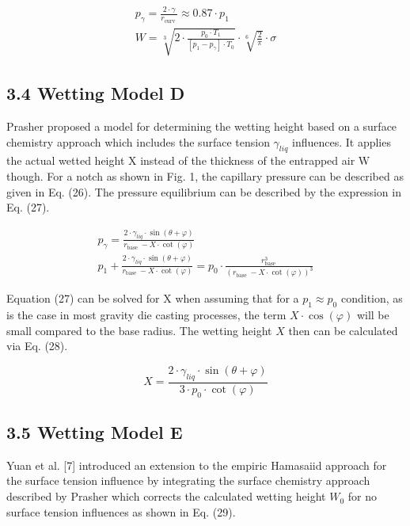 \documentclass[10pt]{article}
\begin{document}
\begin{gather*}
p_{\gamma}=\frac{2 \cdot \gamma}{r_{\text {curv }}} \approx 0.87 \cdot p_{1}  \tag{24}\\
W=\sqrt[3]{2 \cdot \frac{p_{0} \cdot T_{1}}{\left[p_{1}-p_{\gamma}\right] \cdot T_{0}}} \cdot \sqrt[6]{\frac{2}{\pi}} \cdot \sigma \tag{25}
\end{gather*}


\subsection*{3.4 Wetting Model D}
Prasher proposed a model for determining the wetting height based on a surface chemistry approach which includes the surface tension $\gamma_{l i q}$ influences. It applies the actual wetted height $\mathrm{X}$ instead of the thickness of the entrapped air $\mathrm{W}$ though. For a notch as shown in Fig. 1, the capillary pressure can be described as given in Eq. (26). The pressure equilibrium can be described by the expression in Eq. (27).


\begin{gather*}
p_{\gamma}=\frac{2 \cdot \gamma_{l i q} \cdot \sin (\theta+\varphi)}{r_{\text {base }}-X \cdot \cot (\varphi)}  \tag{26}\\
p_{1}+\frac{2 \cdot \gamma_{l i q} \cdot \sin (\theta+\varphi)}{r_{\text {base }}-X \cdot \cot (\varphi)}=p_{0} \cdot \frac{r_{\text {base }}^{3}}{\left(r_{\text {base }}-X \cdot \cot (\varphi)\right)^{3}} \tag{27}
\end{gather*}


Equation (27) can be solved for $\mathrm{X}$ when assuming that for a $p_{1} \approx p_{0}$ condition, as is the case in most gravity die casting processes, the term $X \cdot \cos (\varphi)$ will be small compared to the base radius. The wetting height $X$ then can be calculated via Eq. (28).


\begin{equation*}
X=\frac{2 \cdot \gamma_{l i q} \cdot \sin (\theta+\varphi)}{3 \cdot p_{0} \cdot \cot (\varphi)} \tag{28}
\end{equation*}


\subsection*{3.5 Wetting Model E}
Yuan et al. [7] introduced an extension to the empiric Hamasaiid approach for the surface tension influence by integrating the surface chemistry approach described by Prasher which corrects the calculated wetting height $W_{0}$ for no surface tension influences as shown in Eq. (29).
\end{document}

